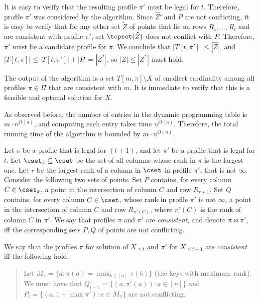 It is easy to verify that the resulting profile $\pi'$ must be legal for $t$. Therefore, profile $\pi'$ was considered by the algorithm. 
Since $\hat Z'$ and $P$ are not conflicting, it is easy to verify that for any other set $\tilde Z$ of points that lie on rows $R_1,\ldots,R_t$ and are consistent with profile $\pi'$, set $\topset(\tilde Z)$ does not conflict with $P$. Therefore, $\pi'$ must be a candidate profile for $\pi$. We conclude that $|T[t,\pi']|\leq |\hat Z|$, and  $|T[t,\pi]|\leq |T[t,\pi']|+|P|=|Z^*|$, so $|Z|\leq |Z^*|$ must hold.

The output of the algorithm is a set $T[m,\pi]\setminus X$ of smallest cardinality among all profiles $\pi\in \Pi$ that are consistent with $m$. It is immediate to verify that this is a feasible and optimal solution for $X$.

As observed before, the number of entries in the dynamic programming table is $m\cdot n^{O(n)}$, and computing each entry takes time $n^{O(n)}$. Therefore, the total running time of the algorithm is bounded by $m\cdot n^{O(n)}$.



\iffalse

%

Let $\pi$ be a profile that is legal for $(t+1)$, and let $\pi'$ be a profile that is legal for $t$. 
Let $\cset_{\pi}\subseteq \cset$ be the set of all columns whose rank in $\pi$ is the largest one.
Let $r$ be the largest rank of a column in $\cset$ in profile $\pi'$, that is not $\infty$.
Consider the following two sets of points. Set $P$ contains, for every column $C\in \cset_{\pi}$, a point in the intersection of column $C$ and row $R_{r+1}$. Set $Q$ contains, for every column $C\in \cset$, whose rank in profile $\pi'$ is not $\infty$, a point in the intersection of column $C$ and row $R_{\pi'(C)}$, where $\pi'(C)$ is the rank of column $C$ in $\pi'$. 
We say that profiles $\pi$ and $\pi'$ are \emph{consistent}, and denote $\pi \bowtie \pi'$, iff the corresponding sets $P,Q$ of points are not conflicting.




%
We say that the profiles $\pi$ for solution of $X_{\leq t}$ and $\pi'$ for $X_{\leq t-1}$ are \emph{consistent} iff the following hold.  



\begin{quote}
Let $M_{\pi} = \{a: \pi(a) = \max_{ b \in [n]} \pi(b)\}$ (the keys with maximum rank). 
We must have that $Q_{t-1}= \{(a, \pi'(a)): a \in [n]\}$ and $P_t= \{(a, 1+\max \pi'): a \in M_{\pi}\}$ are not conflicting. 
%
\end{quote}

